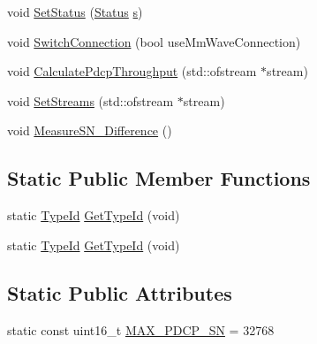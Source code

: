 \begin{DoxyCompactItemize}
\item 
void \hyperlink{classns3_1_1McUePdcp_a3db2f17d18b800a1a644364081d6a2a8}{Set\+Status} (\hyperlink{structns3_1_1McUePdcp_1_1Status}{Status} \hyperlink{generate__test__data__lte__sinr_8m_ad83eeb3a142285d1243a08c6b7026df8}{s})
\item 
void \hyperlink{classns3_1_1McUePdcp_ab2239d009721861c5d460c81fbe8da26}{Switch\+Connection} (bool use\+Mm\+Wave\+Connection)
\item 
void \hyperlink{classns3_1_1McUePdcp_ac3586f5dc45afc13156dcbec5ab6cac4}{Calculate\+Pdcp\+Throughput} (std\+::ofstream $\ast$stream)
\item 
void \hyperlink{classns3_1_1McUePdcp_ace0b344e4b821cb16ce9f1bcfa08112c}{Set\+Streams} (std\+::ofstream $\ast$stream)
\item 
void \hyperlink{classns3_1_1McUePdcp_aae72a344bdc2581f3a0fc3304fbf9bef}{Measure\+S\+N\+\_\+\+Difference} ()
\end{DoxyCompactItemize}
\subsection*{Static Public Member Functions}
\begin{DoxyCompactItemize}
\item 
static \hyperlink{classns3_1_1TypeId}{Type\+Id} \hyperlink{classns3_1_1McUePdcp_adec42632b1e08ad8b239a1e29f58323e}{Get\+Type\+Id} (void)
\item 
static \hyperlink{classns3_1_1TypeId}{Type\+Id} \hyperlink{classns3_1_1McUePdcp_a1138840f8828fcc69fbbe59a564dc904}{Get\+Type\+Id} (void)
\end{DoxyCompactItemize}
\subsection*{Static Public Attributes}
\begin{DoxyCompactItemize}
\item 
static const uint16\+\_\+t \hyperlink{classns3_1_1McUePdcp_a0b032c1d8d1447fa09d67cb1e660d413}{M\+A\+X\+\_\+\+P\+D\+C\+P\+\_\+\+SN} = 32768
\end{DoxyCompactItemize}
